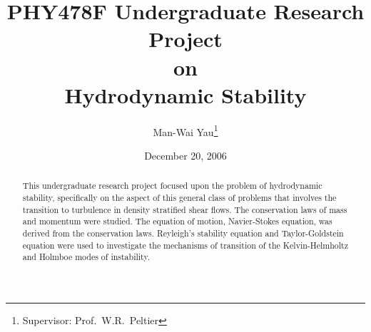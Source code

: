 \documentclass{seminar}
\title{PHY478F Undergraduate Research Project\\on\\Hydrodynamic Stability}
\author{Man-Wai Yau\thanks{Supervisor: Prof.~W.R.~Peltier}}
\date{December 20, 2006}
\begin{document}
\begin{slide}
\maketitle
\newslide
\begin{abstract}
This undergraduate research project focused upon the problem of
hydrodynamic stability, specifically on the aspect of this general
class of problems that involves the transition to turbulence in
density stratified shear flows. The conservation laws of mass and
momentum were studied. The equation of motion, Navier-Stokes
equation, was derived from the conservation laws. Reyleigh's
stability equation and Taylor-Goldstein equation were used to
investigate the mechanisms of transition of the Kelvin-Helmholtz and
Holmboe modes of instability.
\end{abstract}
\newslide
\tableofcontents
\newslide

\newslide

\newslide

\newslide

\newslide

\newslide

\newslide

\newslide

\newslide

\newslide

\newslide

\newslide

\newslide

\newslide

\end{slide}
\end{document}
